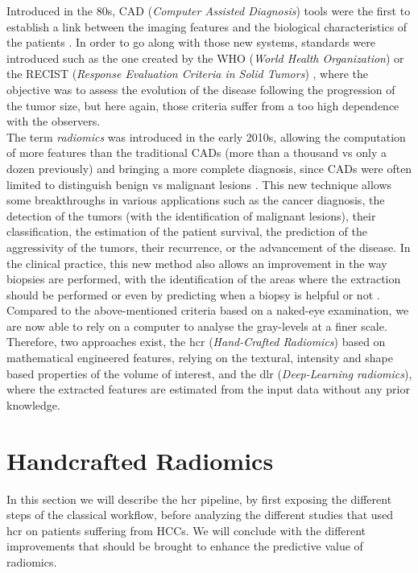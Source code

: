 Introduced in the 80s, CAD (\emph{Computer Assisted Diagnosis}) tools
were the first to establish a link between the
imaging features and the biological characteristics of the patients
\cite{Doi2007}. In order to go along with those new systems, standards were introduced
such as the one created by the WHO (\emph{World Health Organization}) 
or the RECIST (\emph{Response Evaluation Criteria in Solid Tumors})
\cite{Jaffe2006}, where the objective was to assess the
evolution of the disease following the progression of the tumor size,
but here again, those criteria suffer from a too high dependence with
the observers.\\
The term \emph{radiomics} was introduced in the early 2010s, allowing
the computation of more features than the traditional CADs (more
than a thousand vs only a dozen previously) and bringing a more complete
diagnosis, since CADs were often limited to distinguish benign vs
malignant lesions \cite{Afshar2018}.
This new technique allows some breakthroughs in various applications
such as the cancer diagnosis, the detection of the tumors (with the
identification of malignant lesions), their classification, the
estimation of the patient survival, the prediction of the aggressivity
of the tumors, their recurrence, or the advancement of the disease.
In the clinical practice, this new method also allows an improvement in
the way biopsies are performed, with the identification of the areas
where the extraction should be performed \cite{Gillies2016}
or even by predicting when a biopsy is helpful or not \cite{Liu2016}.\\
Compared to the above-mentioned criteria based on a naked-eye examination,
we are now able to rely on a computer to analyse the gray-levels at a
finer scale. Therefore, two approaches exist, the \ac{hcr} (\emph{Hand-Crafted
Radiomics}) based on mathematical engineered features, relying on the
textural, intensity and shape based properties of the volume of interest, and
the \ac{dlr} (\emph{Deep-Learning radiomics}), where the extracted features
are estimated from the input data without any prior
knowledge.

\section{Handcrafted Radiomics }\label{handcrafted-radiomics}

In this section we will describe the \ac{hcr} pipeline, by first
exposing the different steps of the classical workflow, before analyzing
the different studies that used \ac{hcr} on patients suffering from
HCCs. We will conclude with the different improvements that
should be brought to enhance the predictive value of radiomics.

